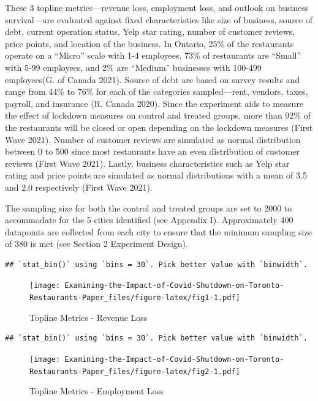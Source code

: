 \documentclass[
]{article}
\begin{document}
These 3 topline metrics---revenue loss, employment loss, and outlook on business survival---are evaluated against fixed characteristics like size of business, source of debt, current operation status, Yelp star rating, number of customer reviews, price points, and location of the business. In Ontario, 25\% of the restaurants operate on a ``Micro'' scale with 1-4 employees, 73\% of restaurants are ``Small'' with 5-99 employees, and 2\% are ``Medium'' businesses with 100-499 employees(G. of Canada 2021). Source of debt are based on survey results and range from 44\% to 76\% for each of the categories sampled---rent, vendors, taxes, payroll, and insurance (R. Canada 2020). Since the experiment aids to measure the effect of lockdown measures on control and treated groups, more than 92\% of the restaurants will be closed or open depending on the lockdown measures (First Wave 2021). Number of customer reviews are simulated as normal distribution between 0 to 500 since most restaurants have an even distribution of customer reviews (First Wave 2021). Lastly, business characteristics such as Yelp star rating and price points are simulated as normal distributions with a mean of 3.5 and 2.0 respectively (First Wave 2021).

The sampling size for both the control and treated groups are set to 2000 to accommodate for the 5 cities identified (see Appendix I). Approximately 400 datapoints are collected from each city to ensure that the minimum sampling size of 380 is met (see Section 2 Experiment Design).

\newpage

\begin{verbatim}
## `stat_bin()` using `bins = 30`. Pick better value with `binwidth`.
\end{verbatim}

\begin{figure}
\centering
\texttt{[image: Examining-the-Impact-of-Covid-Shutdown-on-Toronto-Restaurants-Paper\_files/figure-latex/fig1-1.pdf]}
\caption{\label{fig:fig1}Topline Metrics - Revenue Loss}
\end{figure}

\begin{verbatim}
## `stat_bin()` using `bins = 30`. Pick better value with `binwidth`.
\end{verbatim}

\begin{figure}
\centering
\texttt{[image: Examining-the-Impact-of-Covid-Shutdown-on-Toronto-Restaurants-Paper\_files/figure-latex/fig2-1.pdf]}
\caption{\label{fig:fig2}Topline Metrics - Employment Loss}
\end{figure}
\end{document}
